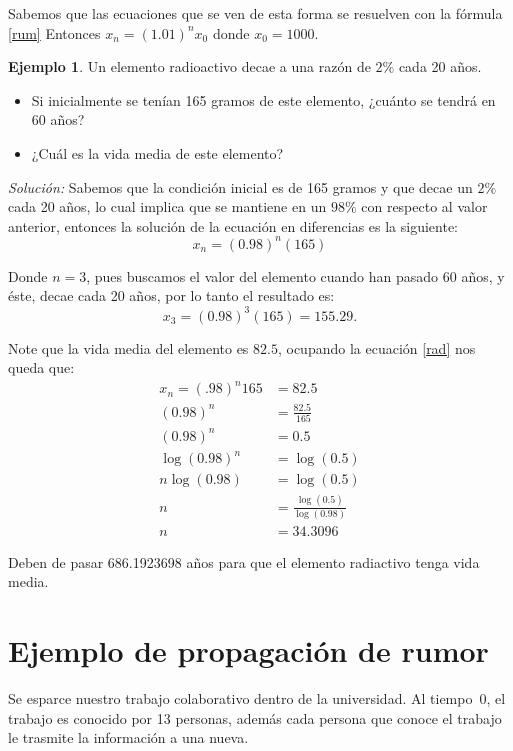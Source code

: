 \documentclass{report}
\theoremstyle{definition}
\newtheorem{ejemplo}[teorema]{Ejemplo}
\begin{document}
Sabemos que las ecuaciones que se ven de esta forma se resuelven con
la fórmula \ref{rum} Entonces $x_n=(1.01)^nx_0$ donde $x_0=1000$.



\begin{ejemplo}
Un elemento radioactivo decae a una razón de $2\%$ cada 20 años.
\begin{itemize}
\item Si inicialmente se tenían 165 gramos de este elemento, ¿cuánto
  se tendrá en 60 años?
 \item ¿Cuál es la vida media de este elemento?
\end{itemize}

\textit{Solución:} Sabemos que la condición inicial es de 165 gramos y
que decae un $2\%$ cada 20 años, lo cual implica que se mantiene en un
$98\%$ con respecto al valor anterior, entonces la solución de la
ecuación en diferencias es la siguiente:
\begin{equation}
  \label{rad}
  x_n=(0.98)^n(165)
\end{equation}

Donde $n=3$, pues buscamos el valor del elemento cuando han pasado 60
años, y éste, decae cada 20 años, por lo tanto el resultado es:
$$x_{3}=(0.98)^3(165)= 155.29.$$

Note que la vida media del elemento es $82.5$, ocupando la ecuación
\ref{rad} nos queda que:
\begin{align*}
  x_n=(.98)^n165&=82.5\\
  (0.98)^n&=\frac{82.5}{\ 165}\\
  (0.98)^n&=0.5\\
  \log{(0.98)^n}&=\log{(0.5)}\\
  n\log{(0.98)}&=\log{(0.5)}\\
  n&=\frac{\log(0.5)}{\log(0.98)}\\
  n&=34.3096     
\end{align*}  

Deben de pasar 686.1923698 años para que el elemento radiactivo tenga
vida media.
\end{ejemplo}


\section{Ejemplo de propagación de rumor}

Se esparce nuestro trabajo colaborativo dentro de la universidad. Al
tiempo~0, el trabajo es conocido por 13 personas, además cada persona que
conoce el trabajo le trasmite la información a una nueva.
\end{document}
